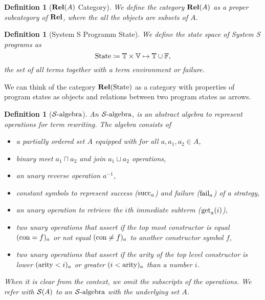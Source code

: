 \documentclass{article}
\newtheorem{definition}[theorem]{Definition}
\newcommand{\Term}{\ensuremath \mathbb{T}}
\newcommand{\Fail}{\ensuremath \mathbb{F}}
\newcommand{\Var}{\ensuremath \mathbb{V}}
\newcommand{\Env}{\ensuremath \Var \mapsto \Term}
\newcommand{\State}{\ensuremath \text{State}}
\newcommand{\Rel}{\ensuremath \mathbf{Rel}}
\newcommand{\Salgebra}{\ensuremath \mathcal{S}\text{-algebra}}
\newcommand{\Salg}{\ensuremath \mathcal{S}}
\newcommand{\lfail}{\ensuremath \operatorname{fail}}
\newcommand{\lsucc}{\ensuremath \operatorname{succ}}
\newcommand{\get}{\ensuremath \operatorname{get}}
\newcommand{\arity}{\ensuremath \operatorname{arity}}
\newcommand{\constructor}{\ensuremath \operatorname{con}}
\begin{document}
\begin{definition}[$\Rel(A)$ Category] \normalfont
  We define the category $\Rel(A)$ as a proper subcategory of $\Rel$, where the all the objects are subsets of $A$.
\end{definition}

\begin{definition}[System S Programm State] \normalfont
  We define the state space of System S programs as \[\State \coloneqq \Term \times \Env \cup \Fail,\] the set of all terms together with a term environment or failure.
\end{definition}

We can think of the category $\Rel(\State)$ as a category with properties of program states as objects and relations between two program states as arrows.

\begin{definition}[$\Salgebra$] \normalfont
  An $\Salgebra$, is an abstract algebra to represent operations for term rewriting. The algebra consists of
  \begin{itemize}
    \item a partially ordered set $A$ equipped with for all $a, a_1, a_2 \in A$,
    \item binary \emph{meet} $a_1 \sqcap a_2$ and \emph{join} $a_1 \sqcup a_2$ operations,
    \item an unary \emph{reverse} operation $a^{-1}$,
    \item constant symbols to represent success ($\lsucc_a$) and failure ($\lfail_a$) of a strategy,
    \item an unary operation to retrieve the $i$th immediate subterm ($\get_a(i)$),
    \item two unary operations that assert if the top most constructor is equal $(\constructor = f)_a$ or not equal $(\constructor \neq f)_a$ to another constructor symbol $f$,
    \item two unary operations that assert if the arity of the top level constructor is lower $(\arity < i)_a$ or greater $(i < \arity)_a$ than a number $i$.
  \end{itemize}
  When it is clear from the context, we omit the subscripts of the operations. We refer with $\Salg(A)$ to an $\Salgebra$ with the underlying set $A$.

  \par\medskip
   

\end{definition}
\end{document}
